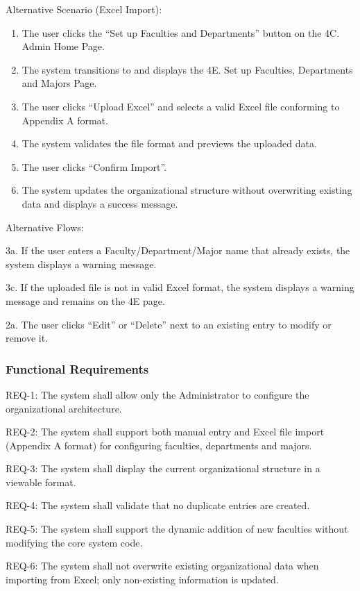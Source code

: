 Alternative Scenario (Excel Import):
\begin{enumerate}
\item The user clicks the ``Set up Faculties and Departments'' button on the 4C. Admin Home Page.
\item The system transitions to and displays the 4E. Set up Faculties, Departments and Majors Page.
\item The user clicks ``Upload Excel'' and selects a valid Excel file conforming to Appendix A format.
\item The system validates the file format and previews the uploaded data.
\item The user clicks ``Confirm Import''.
\item The system updates the organizational structure without overwriting existing data and displays a success message.
\end{enumerate}

Alternative Flows:

3a. If the user enters a Faculty/Department/Major name that already exists, the system displays a warning message.

3c. If the uploaded file is not in valid Excel format, the system displays a warning message and remains on the 4E page.

2a. The user clicks ``Edit'' or ``Delete'' next to an existing entry to modify or remove it.

\subsubsection{Functional Requirements}

REQ-1: The system shall allow only the Administrator to configure the organizational architecture.

REQ-2: The system shall support both manual entry and Excel file import (Appendix A format) for configuring faculties, departments and majors.

REQ-3: The system shall display the current organizational structure in a viewable format.

REQ-4: The system shall validate that no duplicate entries are created.

REQ-5: The system shall support the dynamic addition of new faculties without modifying the core system code.

REQ-6: The system shall not overwrite existing organizational data when importing from Excel; only non-existing information is updated.

